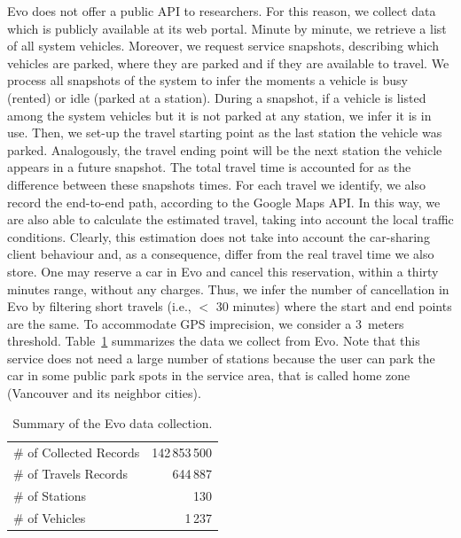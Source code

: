 Evo does not offer a public API to researchers. For this reason, we collect data which is publicly available at its web portal. Minute by minute, we retrieve a list of all system vehicles. Moreover, we request service snapshots, describing which vehicles are parked, where they are parked and if they are available to travel. 
We process all snapshots of the system to infer the moments a vehicle is busy (rented) or idle (parked at a station). During a snapshot, if a vehicle is listed among the system vehicles but it is not parked at any station, we infer it is in use. Then, we set-up the travel starting point as the last station the vehicle was parked. Analogously, the travel ending point will be the next station the vehicle appears in a future snapshot. The total travel time is accounted for as the difference between these snapshots times. 
For each travel we identify, we also record the end-to-end path, according to the Google Maps API. In this way, we are also able to calculate the estimated travel, taking into account the local traffic conditions. Clearly, this estimation does not take into account the car-sharing client behaviour and, as a consequence, differ from the real travel time we also store. 
One may reserve a car in Evo and cancel this reservation, within a thirty minutes range, without any charges. Thus, we infer the number of cancellation in Evo by filtering short travels (i.e., $<$ 30 minutes) where the start and end points are the same. To accommodate GPS imprecision, we consider a 3~meters threshold. 
Table~\ref{table:4_3_dataEvo} summarizes the data we collect from Evo.
Note that this service does not need a large number of stations because the user can park the car in some public park spots in the service area, that is called home zone (Vancouver and its neighbor cities).

\begin{table}[htb]
\centering
\setlength{\tabcolsep}{2.3pt}

\begin{tabular}{llr}
\hline
\multicolumn{2}{l}{\# of Collected Records} & 142\,853\,500
\\
\multicolumn{2}{l}{\# of Travels Records} &  644\,887\\
\multicolumn{2}{l}{\# of Stations}  & 130  \\\hline
\multicolumn{2}{l}{\# of Vehicles} & 1\,237
\\\hline
\end{tabular}
\caption{Summary of the Evo data collection.}
\label{table:4_3_dataEvo}
\end{table}

